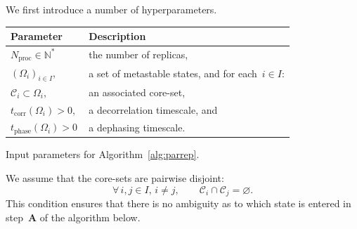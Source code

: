 \documentclass[a4]{article}
\newcommand{\N}{\mathbb N}
\newcommand{\1}{\mathbbm 1}
\newcommand{\corr}{\mathrm{corr}}
\newcommand{\phase}{\mathrm{phase}}
\begin{document}
    We first introduce a number of hyperparameters.
    \noindent
{
\begin{center}
\begin{tabular}{ll}
\toprule
\textbf{Parameter} & \textbf{Description} \\
\midrule
$N_{\mathrm{proc}}\in\N^*$ & the number of replicas,\\
$(\Omega_i)_{i\in I}$,& a set of metastable states, and for each~$i\in I$: \\
$\mathcal C_i\subset \Omega_i,$ & an associated core-set, \\
$t_{\corr}(\Omega_i)>0,$ & a decorrelation timescale, and\\
$t_{\phase}(\Omega_i)>0\,$ & a dephasing timescale. \\
\bottomrule
\end{tabular}

\noindent
Input parameters for Algorithm~\ref{alg:parrep}.
\end{center}
}
We assume that the core-sets are pairwise disjoint:
\begin{equation}
    \label{eq:disjoint_coresets}
    \forall\,i,j\in I,\,i\neq j,\qquad \mathcal C_i \cap \mathcal C_j =\varnothing.
\end{equation}
This condition ensures that there is no ambiguity as to which state is entered in step~{\bf{A}} of the algorithm below.
\end{document}
